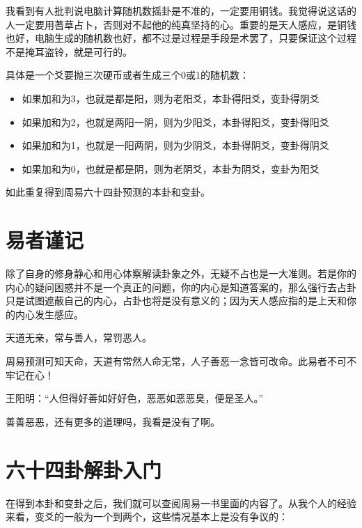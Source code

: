 \documentclass[12pt,oneside]{book}
\begin{document}
我看到有人批判说电脑计算随机数摇卦是不准的，一定要用铜钱。我觉得说这话的人一定要用蓍草占卜，否则对不起他的纯真坚持的心。重要的是天人感应，是铜钱也好，电脑生成的随机数也好，都不过是过程是手段是术罢了，只要保证这个过程不是掩耳盗铃，就是可行的。

具体是一个爻要抛三次硬币或者生成三个0或1的随机数：

\begin{itemize}
\item 如果加和为3，也就是都是阳，则为老阳爻，本卦得阳爻，变卦得阴爻
\item 如果加和为2，也就是两阳一阴，则为少阳爻，本卦得阳爻，变卦得阳爻
\item 如果加和为1，也就是一阳两阴，则为少阴爻，本卦得阴爻，变卦得阴爻
\item 如果加和为0，也就是都是阴，则为老阴爻，本卦为阴爻，变卦为阳爻
\end{itemize}


如此重复得到周易六十四卦预测的本卦和变卦。

\section{易者谨记}
除了自身的修身静心和用心体察解读卦象之外，无疑不占也是一大准则。若是你的内心的疑问困惑并不是一个真正的问题，你的内心是知道答案的，那么强行去占卦只是试图遮蔽自己的内心，占卦也将是没有意义的；因为天人感应指的是上天和你的内心发生感应。

天道无亲，常与善人，常罚恶人。

周易预测可知天命，天道有常然人命无常，人子善恶一念皆可改命。此易者不可不牢记在心！

王阳明：“人但得好善如好好色，恶恶如恶恶臭，便是圣人。”

善善恶恶，还有更多的道理吗，我看是没有了啊。

\section{六十四卦解卦入门}
在得到本卦和变卦之后，我们就可以查阅周易一书里面的内容了。从我个人的经验来看，变爻的一般为一个到两个，这些情况基本上是没有争议的：
\end{document}
